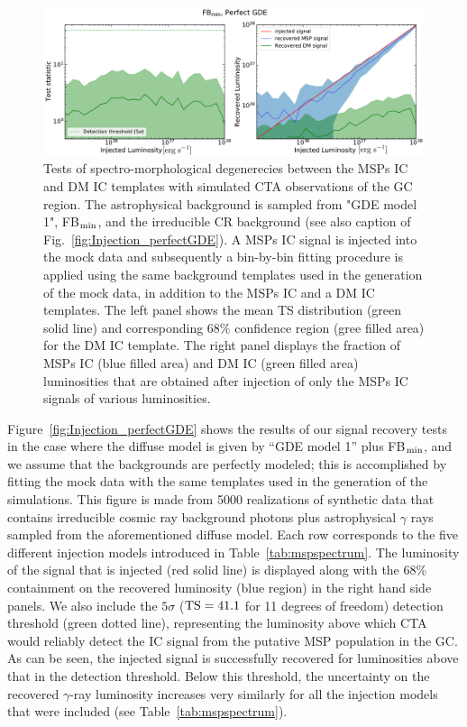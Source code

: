 \documentclass[doublespace,nopageskip]{VTthesis} %
\begin{document}
\begin{figure}
    \begin{center}
    \includegraphics[scale = 0.48]{Figures/CTA/TS-dm-mis-False-Fermi-min-True.pdf}
\caption{Tests of spectro-morphological degenerecies between the MSPs IC and DM IC templates with simulated CTA observations of the GC region. The astrophysical background is sampled from "GDE model 1", FB$_{\rm min}$, and the irreducible CR background (see also caption of Fig.~\ref{fig:Injection_perfectGDE}). A MSPs IC signal is injected into the mock data and subsequently a bin-by-bin fitting procedure is applied using the same background templates used in the generation of the mock data, in addition to the MSPs IC and a DM IC templates. The left panel shows the mean TS distribution (green solid line) and corresponding 68\% confidence region (gree filled area) for the DM IC template. The right panel displays the fraction of MSPs IC (blue filled area) and DM IC (green filled area) luminosities that are obtained after injection of only the MSPs IC signals of various luminosities. }\label{fig:MSPsvsDM_perfectGDE}
    \end{center}
\end{figure}


Figure~\ref{fig:Injection_perfectGDE} shows the results of our signal recovery tests in the case where the diffuse model is given by ``GDE model 1'' plus FB$_{\rm min}$, and we assume that the backgrounds are perfectly modeled; this is accomplished by fitting the mock data with the same templates used in the generation of the simulations. This figure is made from 5000 realizations of synthetic data that contains irreducible cosmic ray background photons plus astrophysical $\gamma$ rays sampled from the aforementioned diffuse model. Each row corresponds to the five different injection models introduced in Table~\ref{tab:mspspectrum}. The luminosity of the signal that is injected (red solid line) is displayed along with the 68\% containment on the recovered luminosity (blue region) in the right hand side panels. We also include the $5\sigma$ (${\rm TS}=41.1$ for 11 degrees of freedom) detection threshold (green dotted line), representing the luminosity above which CTA would reliably detect the IC signal from the putative MSP population in the GC. As can be seen, the injected signal is successfully recovered for luminosities above that in the detection threshold. Below this threshold, the uncertainty on the recovered $\gamma$-ray luminosity increases very similarly for all the injection models that were included (see Table~\ref{tab:mspspectrum}).     
\end{document}
